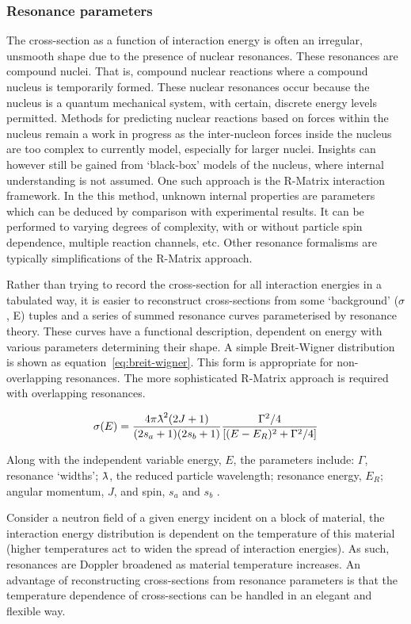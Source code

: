 \subsubsection{Resonance parameters}
The cross-section as a function of interaction energy is often an irregular, unsmooth shape due to the presence of nuclear resonances. These resonances are compound nuclei. That is, compound nuclear reactions where a compound nucleus is temporarily formed. These nuclear resonances occur because the nucleus is a quantum mechanical system, with certain, discrete energy levels permitted. Methods for predicting nuclear reactions based on forces within the nucleus remain a work in progress as the inter-nucleon forces inside the nucleus are too complex to currently model, especially for larger nuclei. Insights can however still be gained from `black-box' models of the nucleus, where internal understanding is not assumed. One such approach is the R-Matrix interaction framework. In the this method, unknown internal properties are parameters which can be deduced by comparison with experimental results. It can be performed to varying degrees of complexity, with or without particle spin dependence, multiple reaction channels, etc. Other resonance formalisms are typically simplifications of the R-Matrix approach.

Rather than trying to record the cross-section for all interaction energies in a tabulated way, it is easier to reconstruct cross-sections from some `background' ($\sigma$, E) tuples and a series of summed resonance curves parameterised by resonance theory. These curves have a functional description, dependent on energy with various parameters determining their shape. A simple Breit-Wigner distribution is shown as equation~\ref{eq:breit-wigner}. This form is appropriate for non-overlapping resonances. The more sophisticated R-Matrix approach is required with overlapping resonances. 

\begin{equation}
  \sigma(E) = \frac{4\pi\lambdabar^{2}(2J + 1)}{(2s_{a} + 1)(2s_{b} + 1)}  \frac{\Gamma^{2}/4}{[(E-E_{R})^{2} + \Gamma^{2}/4]}
  \label{eq:breit-wigner}
\end{equation}

Along with the independent variable energy, $E$, the parameters include: $\Gamma$, resonance `widths'; $\lambdabar$, the reduced particle wavelength; resonance energy, $E_{R}$; angular momentum, $J$, and spin, $s_{a}$ and $s_{b}$ \cite{Libby2005}. 

Consider a neutron field of a given energy incident on a block of material, the interaction energy distribution is dependent on the temperature of this material (higher temperatures act to widen the spread of interaction energies). As such, resonances are Doppler broadened as material temperature increases. An advantage of reconstructing cross-sections from resonance parameters is that the temperature dependence of cross-sections can be handled in an elegant and flexible way. 


